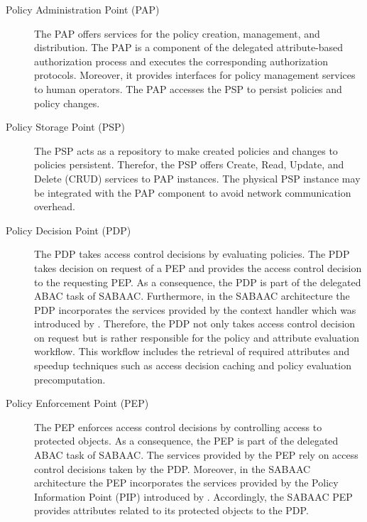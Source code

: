 \begin{description}
    \item[Policy Administration Point (PAP)] The PAP offers services for the policy creation, management, and distribution.
    The PAP is a component of the delegated attribute-based authorization process and executes the corresponding authorization protocols.
    Moreover, it provides interfaces for policy management services to human operators.
    The PAP accesses the PSP to persist policies and policy changes.
    \item[Policy Storage Point (PSP)] The PSP acts as a repository to make created policies and changes to policies persistent.
    Therefor, the PSP offers Create, Read, Update, and Delete (CRUD) services to PAP instances.
    The physical PSP instance may be integrated with the PAP component to avoid network communication overhead.
    \item[Policy Decision Point (PDP)] The PDP takes access control decisions by evaluating policies.
    The PDP takes decision on request of a PEP and provides the access control decision to the requesting PEP.
    As a consequence, the PDP is part of the delegated ABAC task of SABAAC.
    Furthermore, in the SABAAC architecture the PDP incorporates the services provided by the context handler which was introduced by \citeauthor{Hu2014} \cite{Hu2014}.
    Therefore, the PDP not only takes access control decision on request but is rather responsible for the policy and attribute evaluation workflow.
    This workflow includes the retrieval of required attributes and speedup techniques such as access decision caching and policy evaluation precomputation.
    \item[Policy Enforcement Point (PEP)] The PEP enforces access control decisions by controlling access to protected objects.
    As a consequence, the PEP is part of the delegated ABAC task of SABAAC.
    The services provided by the PEP rely on access control decisions taken by the PDP.
    Moreover, in the SABAAC architecture the PEP incorporates the services provided by the Policy Information Point (PIP) introduced by \citeauthor{Hu2014} \cite{Hu2014}.
    Accordingly, the SABAAC PEP provides attributes related to its protected objects to the PDP.
\end{description}

